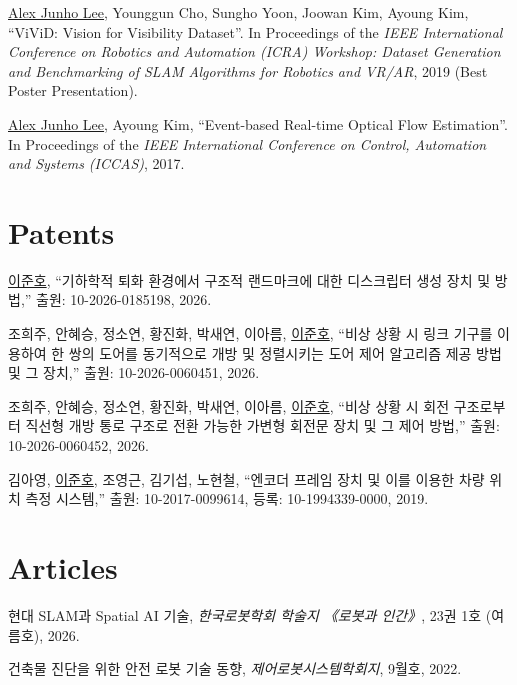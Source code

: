 \documentclass[margin]{res}
\begin{document}
\begin{resume}
		\par\underline{Alex Junho Lee}, Younggun Cho, Sungho Yoon, Joowan Kim, Ayoung Kim, ``ViViD: Vision for Visibility Dataset''. In Proceedings of the \textit{IEEE International Conference on Robotics and Automation (ICRA) Workshop: Dataset Generation and Benchmarking of SLAM Algorithms for Robotics and VR/AR}, 2019 (Best Poster Presentation).

		\par\underline{Alex Junho Lee}, Ayoung Kim, ``Event-based Real-time Optical Flow Estimation''. In Proceedings of the \textit{IEEE International Conference on Control, Automation and Systems (ICCAS)}, 2017.
		

		\section{Patents}
		\par \underline{이준호}, ``기하학적 퇴화 환경에서 구조적 랜드마크에 대한 디스크립터 생성 장치 및 방법,'' 출원: \mbox{10-2026-0185198}, 2026.

		\par 조희주, 안혜승, 정소연, 황진화, 박새연, 이아름, \underline{이준호}, ``비상 상황 시 링크 기구를 이용하여 한 쌍의 도어를 동기적으로 개방 및 정렬시키는 도어 제어 알고리즘 제공 방법 및 그 장치,'' 출원: 10-2026-0060451, 2026.

		\par 조희주, 안혜승, 정소연, 황진화, 박새연, 이아름, \underline{이준호}, ``비상 상황 시 회전 구조로부터 직선형 개방 통로 구조로 전환 가능한 가변형 회전문 장치 및 그 제어 방법,'' 출원: 10-2026-0060452, 2026.

		\par 김아영, \underline{이준호}, 조영근, 김기섭, 노현철, ``엔코더 프레임 장치 및 이를 이용한 차량 위치 측정 시스템,'' 출원: 10-2017-0099614, 등록: 10-1994339-0000, 2019.


		\section{Articles}
		\par 현대 SLAM과 Spatial AI 기술, \textit{한국로봇학회 학술지 《로봇과 인간》}, 23권 1호 (여름호), 2026.

		\par 건축물 진단을 위한 안전 로봇 기술 동향, \textit{제어로봇시스템학회지}, 9월호, 2022.


\end{resume}
\end{document}
